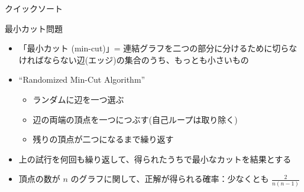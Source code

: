\documentclass[dvipdfmx]{beamer}
\begin{document}
\begin{frame}[t,fragile]{クイックソート}
\end{frame}

\begin{frame}[t,fragile]{最小カット問題}
  \begin{itemize}
    \setlength{\itemsep}{1em}
  \item 「最小カット (min-cut)」= 連結グラフを二つの部分に分けるために切らなければならない辺(エッジ)の集合のうち、もっとも小さいもの
  \item ``Randomized Min-Cut Algorithm''
    \begin{itemize}
    \item ランダムに辺を一つ選ぶ
    \item 辺の両端の頂点を一つにつぶす(自己ループは取り除く)
    \item 残りの頂点が二つになるまで繰り返す
    \end{itemize}
  \item 上の試行を何回も繰り返して、得られたうちで最小なカットを結果とする
  \item 頂点の数が $n$ のグラフに関して、正解が得られる確率：少なくとも $\frac{2}{n(n-1)}$
  \end{itemize}
\end{frame}
\end{document}
